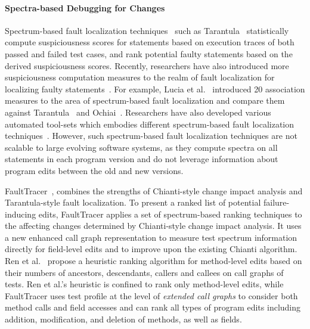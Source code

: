 \documentclass[runningheads,a4paper]{llncs}
\begin{document}
\paragraph{Spectra-based Debugging for Changes} 
Spectrum-based fault localization techniques~\cite{hao2005similarity, hao09:interactive, jones2005empirical, abreu2007accuracy, baudry2006improving, liblit2005scalable, yu2008empirical, abreu2009practical} such as Tarantula~\cite{jones2002visualization} statistically compute suspiciousness scores for statements based on execution traces of both passed and failed test cases, and rank potential faulty statements based on the derived suspiciousness scores. Recently, researchers have also introduced more suspiciousness computation measures to the realm of fault localization for localizing faulty statements~\cite{naish2011model, lo2010comprehensive}. For example, Lucia et al.~\cite{lo2010comprehensive} introduced 20 association measures to the area of spectrum-based fault localization and compare them against Tarantula~\cite{jones2002visualization} and Ochiai~\cite{abreu2007accuracy}. Researchers have also developed various automated tool-sets which embodies different spectrum-based fault localization techniques~\cite{tarantula-url, janssen2009zoltar}. However, such spectrum-based fault localization techniques are not scalable to large evolving software systems, as they compute spectra on all statements in each program version and do not leverage information about program edits between the old and new versions.

FaultTracer~\cite{zhang2011localizing}, combines the strengths of Chianti-style change impact analysis and Tarantula-style fault localization. To present a ranked list of potential failure-inducing edits, FaultTracer applies a set of spectrum-based ranking techniques to the affecting changes determined by Chianti-style change impact analysis. It uses a new enhanced call graph representation to measure test spectrum information directly for field-level edits and to improve upon the existing Chianti algorithm. Ren et al.~\cite{ren2007heuristic} propose a heuristic ranking algorithm for method-level edits based on their numbers of ancestors, descendants, callers and callees on call graphs of tests. Ren et al.'s heuristic is confined to rank only method-level edits, while FaultTracer uses test profile at the level of {\em extended call graphs} to consider both method calls and field accesses and can rank all types of program edits including addition, modification, and deletion of methods, as well as fields.  
\end{document}
